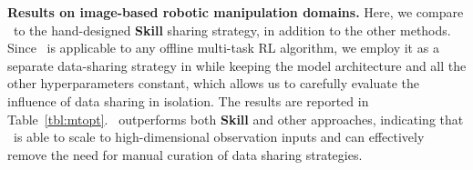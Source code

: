 \textbf{Results on image-based robotic manipulation domains.}  %
Here, we compare \cdsmethodname\ to the hand-designed \textbf{Skill} sharing strategy, in addition to the other methods.   Since \cdsmethodname\ is applicable to any offline multi-task RL algorithm, we employ it as a separate data-sharing strategy in \citep{kalashnikov2021mt} while keeping the model architecture and all the other hyperparameters constant, which allows us to carefully evaluate the influence of data sharing in isolation. The results are reported in Table~\ref{tbl:mtopt}. \cdsmethodname\ outperforms both \textbf{Skill} and other approaches, indicating that \cdsmethodname\ is able to scale to high-dimensional observation inputs and can effectively remove the need for manual curation of data sharing strategies.

